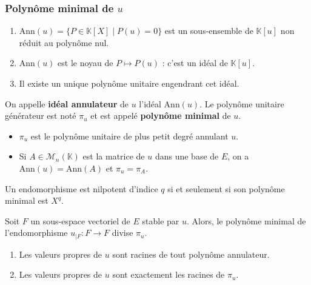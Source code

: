 	\subsubsection{Polynôme minimal de \texorpdfstring{$u$}{u}}


	\begin{lemma}
		\begin{enumerate}[label=(\roman*)]
			\item $\mathrm{Ann}(u) = \{ P \in \mathbb{K}[X] \mid P(u) = 0 \}$ est un sous-ensemble de $\mathbb{K}[u]$ non réduit au polynôme nul.
			\item $\mathrm{Ann}(u)$ est le noyau de $P \mapsto P(u)$ : c'est un idéal de $\mathbb{K}[u]$.
			\item Il existe un unique polynôme unitaire engendrant cet idéal.
		\end{enumerate}
	\end{lemma}

	\begin{definition}
		On appelle \textbf{idéal annulateur} de $u$ l'idéal $\mathrm{Ann}(u)$. Le polynôme unitaire générateur est noté $\pi_u$ et est appelé \textbf{polynôme minimal} de $u$.
	\end{definition}

	\begin{remark}
		\begin{itemize}
			\item $\pi_u$ est le polynôme unitaire de plus petit degré annulant $u$.
			\item Si $A \in \mathcal{M}_n(\mathbb{K})$ est la matrice de $u$ dans une base de $E$, on a $\mathrm{Ann}(u) = \mathrm{Ann}(A)$ et $\pi_u = \pi_A$.
		\end{itemize}
	\end{remark}

	\begin{example}
		Un endomorphisme est nilpotent d'indice $q$ si et seulement si son polynôme minimal est $X^q$.
	\end{example}

	\begin{proposition}
		Soit $F$ un sous-espace vectoriel de $E$ stable par $u$. Alors, le polynôme minimal de l'endomorphisme $u_{|F} : F \rightarrow F$ divise $\pi_u$.
	\end{proposition}

	\begin{proposition}
		\begin{enumerate}[label=(\roman*)]
			\item Les valeurs propres de $u$ sont racines de tout polynôme annulateur.
			\item Les valeurs propres de $u$ sont exactement les racines de $\pi_u$.
		\end{enumerate}
	\end{proposition}

